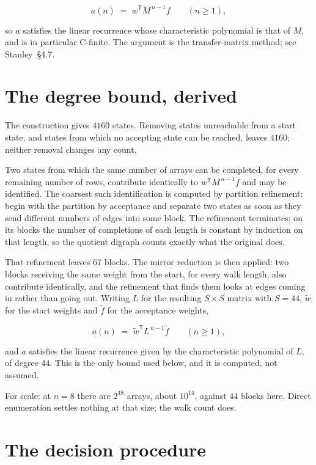 \documentclass[11pt]{article}
\theoremstyle{definition}
\begin{document}
\[a(n) \;=\; w^{\mathsf T} M^{\,n-1} f \qquad (n \ge 1),\]

so $a$ satisfies the linear recurrence whose characteristic polynomial is that of $M$, and is in particular C-finite. The argument is the transfer-matrix method; see Stanley~\S4.7.

\section{The degree bound, derived}

The construction gives $4160$ states. Removing states unreachable from a start state, and states from which no accepting state can be reached, leaves $4160$; neither removal changes any count.

Two states from which the same number of arrays can be completed, for every remaining number of rows, contribute identically to $w^{\mathsf T}M^{\,n-1}f$ and may be identified. The coarsest such identification is computed by partition refinement: begin with the partition by acceptance and separate two states as soon as they send different numbers of edges into some block. The refinement terminates; on its blocks the number of completions of each length is constant by induction on that length, so the quotient digraph counts exactly what the original does.

That refinement leaves $67$ blocks. The mirror reduction is then applied: two blocks receiving the same weight from the start, for every walk length, also contribute identically, and the refinement that finds them looks at edges coming in rather than going out. Writing $L$ for the resulting $S \times S$ matrix with $S = 44$, $\tilde w$ for the start weights and $\tilde f$ for the acceptance weights,

\[a(n) \;=\; \tilde w^{\mathsf T} L^{\,n-1} \tilde f \qquad (n \ge 1),\]

and $a$ satisfies the linear recurrence given by the characteristic polynomial of $L$, of degree $44$. This is the only bound used below, and it is computed, not assumed.

For scale: at $n = 8$ there are $2^{48}$ arrays, about $10^{14}$, against $44$ blocks here. Direct enumeration settles nothing at that size; the walk count does.

\section{The decision procedure}
\end{document}
